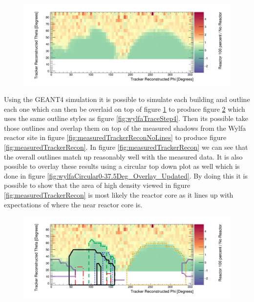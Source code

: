 \begin{figure}[htbp]
 \centering
 \includegraphics[width=\linewidth]{Chapter5/Figs/wylfaRasterNew/simulatedTrackerReconNoLines.png}
 \label{fig:simulatedTrackerReconNoLines}
\end{figure}

Using the GEANT4 simulation it is possible to simulate each building and outline each one which can then be overlaid on top of figure \ref{fig:simulatedTrackerReconNoLines} to produce figure \ref{fig:simulatedTrackerRecon} which uses the same outline styles as figure \ref{fig:wylfaTraceStep4}. Then its possible take those outlines and overlap them on top of the measured shadows from the Wylfa reactor site in figure \ref{fig:measuredTrackerReconNoLines} to produce figure \ref{fig:measuredTrackerRecon}. In figure \ref{fig:measuredTrackerRecon} we can see that the overall outlines match up reasonably well with the measured data. It is also possible to overlay these results using a circular top down plot as well which is done in figure \ref{fig:wylfaCircular0-37.5Deg_Overlay_Updated}. By doing this it is possible to show that the area of high density viewed in figure \ref{fig:measuredTrackerRecon} is most likely the reactor core as it lines up with expectations of where the near reactor core is. 

\begin{figure}[htbp]
 \centering
 \includegraphics[width=\linewidth]{Chapter5/Figs/wylfaRasterNew/simulatedTrackerRecon.png}
 \label{fig:simulatedTrackerRecon}
\end{figure}

